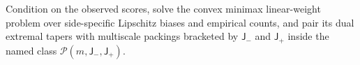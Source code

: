 Condition on the observed scores, solve the convex minimax linear-weight problem over side-specific Lipschitz biases and empirical counts, and pair its dual extremal tapers with multiscale packings bracketed by \(\mathsf J_{-}\) and \(\mathsf J_{+}\) inside the named class \(\mathcal P(m,\mathsf J_{-},\mathsf J_{+})\).